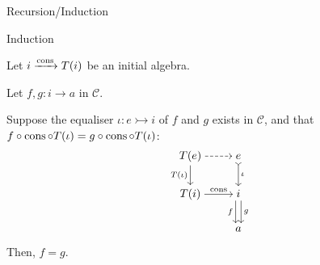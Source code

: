 \begin{frame}{Recursion/Induction} %
  
  \begin{block}{Induction}
    
    \par Let $i \xrightarrow{\operatorname{cons}} T(i)$ be an initial algebra.
    \par Let $f, g : i \to a$ in $\mathcal{C}$.
    \par Suppose the equaliser $\iota : e \rightarrowtail i$ of $f$ and $g$ exists in $\mathcal{C}$, and that $f \circ \operatorname{cons} \circ T(\iota) = g \circ \operatorname{cons} \circ T(\iota)$:
    \vspace{-0.5 \baselineskip}
    \begin{align*}
      \begin{tikzcd}[cramped, ampersand replacement = \;]
          T(e)
            \arrow[r, dashed]
            \arrow[d, "T(\iota)"']
          \;
          e
            \arrow[d, "\iota", tail]
        \\
          T(i)
            \arrow[r, "\cons"]
          \;
          i
            \arrow[d, "f"', shift right]
            \arrow[d, "g", shift left]
        \\
          \;
          a
      \end{tikzcd}
    \end{align*}
    \par Then, $f = g$.

  \end{block}

\end{frame}

